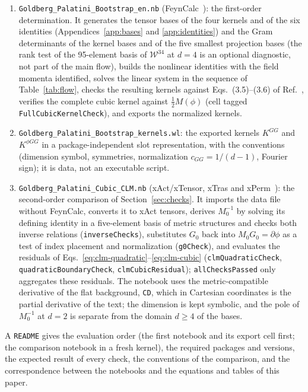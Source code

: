 \documentclass[prd,aps,preprint,superscriptaddress,nofootinbib,amsmath,amssymb,eqsecnum]{revtex4-2}
\newcommand{\W}{\mathcal{W}}
\begin{document}
\begin{enumerate}
\item \texttt{Goldberg\_Palatini\_Bootstrap\_en.nb} (FeynCalc~\cite{FeynCalc}): the first-order
determination. It generates the tensor bases of the four kernels and of the six identities
(Appendices~\ref{app:bases} and \ref{app:identities}) and the Gram determinants of the kernel
bases and of the five smallest projection bases (the rank test of the 95-element basis of
$\W^{34}$ at $d=4$ is an optional diagnostic, not part of the main flow), builds the
nonlinear identities with the field momenta identified, solves the linear system in the sequence of
Table~\ref{tab:flow}, checks the resulting kernels against Eqs.~(3.5)--(3.6) of
Ref.~\cite{BrandtMcKeon2016}, verifies the complete cubic kernel against $\tfrac12M(\phi)$
(cell tagged \texttt{FullCubicKernelCheck}), and exports the normalized kernels.
\item \texttt{Goldberg\_Palatini\_Bootstrap\_kernels.wl}: the exported kernels $K^{GG}$ and
$K^{\phi GG}$ in a package-independent slot representation, with the conventions
(dimension symbol, symmetries, normalization $c_{GG}=1/(d-1)$, Fourier sign); it is data,
not an executable script.
\item \texttt{Goldberg\_Palatini\_Cubic\_CLM.nb} (xAct/xTensor, xTras and xPerm~\cite{xPerm}):
the second-order comparison of Section~\ref{sec:checks}. It imports the data file without
FeynCalc, converts it to xAct tensors, derives $M_0^{-1}$ by solving its defining identity in
a five-element basis of metric structures and checks both inverse relations
(\texttt{inverseChecks}), substitutes $G_0$ back into $M_0G_0=\partial\phi$ as a test of index
placement and normalization (\texttt{g0Check}), and evaluates the residuals of
Eqs.~\eqref{eq:clm-quadratic}--\eqref{eq:clm-cubic}
(\texttt{clmQuadraticCheck}, \texttt{quadraticBoundaryCheck}, \texttt{clmCubicResidual});
\texttt{allChecksPassed} only aggregates these residuals. The notebook uses the
metric-compatible derivative of the flat background, \texttt{CD}, which in Cartesian
coordinates is the partial derivative of the text; the dimension is kept symbolic, and the
pole of $M_0^{-1}$ at $d=2$ is separate from the domain $d\geq4$ of the bases.
\end{enumerate}
A \texttt{README} gives the evaluation order (the first notebook and its export cell first;
the comparison notebook in a fresh kernel), the required packages and versions, the expected
result of every check, the conventions of the comparison, and the correspondence between the
notebooks and the equations and tables of this paper.
\end{document}
